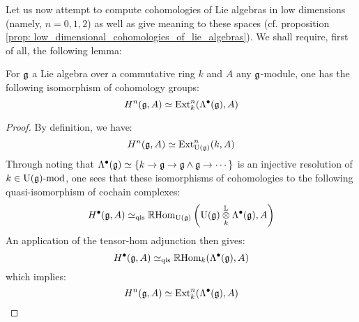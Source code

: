                     Let us now attempt to compute cohomologies of Lie algebras in low dimensions (namely, $n = 0, 1, 2$) as well as give meaning to these spaces (cf. proposition \ref{prop: low_dimensional_cohomologies_of_lie_algebras}). We shall require, first of all, the following lemma:
                    \begin{lemma} \label{lemma: de_rham_resolutions_of_lie_algebras}
                        For $\mathfrak{g}$ a Lie algebra over a commutative ring $k$ and $A$ any $\mathfrak{g}$-module, one has the following isomorphism of cohomology groups:
                            $$H^n(\mathfrak{g}, A) \simeq \mathrm{Ext}^n_k(\Lambda^{\bullet}(\mathfrak{g}), A)$$
                    \end{lemma}
                        \begin{proof}
                            By definition, we have:
                                $$H^n(\mathfrak{g}, A) \simeq \mathrm{Ext}^n_{\mathrm{U}(\mathfrak{g})}(k, A)$$
                            Through noting that $\Lambda^{\bullet}(\mathfrak{g}) \simeq \{k \to \mathfrak{g} \to \mathfrak{g} \wedge \mathfrak{g} \to \cdots\}$ is an injective resolution of $k \in \mathrm{U}(\mathfrak{g})\text{-}\mathrm{mod}$, one sees that these isomorphisms of cohomologies  to the following quasi-isomorphism of cochain complexes:
                                $$H^{\bullet}(\g, A) \cong_{\qis} \R\Hom_{\U(\g)}\left(\U(\g) \tensor_k^{\L} \Lambda^{\bullet}(\g), A\right)$$
                            An application of the tensor-hom adjunction then gives:
                                $$H^{\bullet}(\mathfrak{g}, A) \simeq_{\mathrm{qis}} \mathbb{R}\mathrm{Hom}_k(\Lambda^{\bullet}(\mathfrak{g}), A)$$
                            which implies:
                                $$H^n(\mathfrak{g}, A) \simeq \mathrm{Ext}^n_k(\Lambda^{\bullet}(\mathfrak{g}), A)$$
                        \end{proof}
                    
